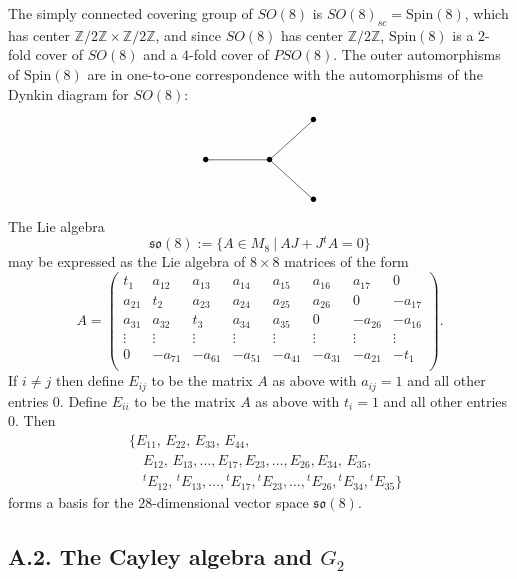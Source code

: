 \documentclass[12pt,letterpaper]{amsart}
\theoremstyle{plain}
\theoremstyle{definition}
\theoremstyle{remark}
\theoremstyle{definition}
\newcommand{\zzz}{\mathbb{Z}}
\begin{document}
The simply connected covering group of $SO(8)$ is
$SO(8)_{sc} = \mathrm{Spin}(8)$, which has center $\zzz /2\zzz \times \zzz /2\zzz$,
and since $SO(8)$ has center $\zzz /2\zzz$, $\mathrm{Spin}(8)$ is a $2$-fold cover
of $SO(8)$ and a $4$-fold cover of $PSO(8)$. The outer automorphisms
of $\mathrm{Spin}(8)$ are in one-to-one correspondence with the automorphisms
of the Dynkin diagram for $SO(8)$:
\[
\begin{tikzpicture}[baseline=(c.base)]
\draw (0,0) -- (-1.6,0) (0,0) -- (1.1,1.0) (0,0) -- (1.1,-1.0);
\node (c) at (0,0) {$\bullet$};
\node at (-1.6,0) {$\bullet$};
\node at (1.1,1.0) {$\bullet$};
\node at (1.1,-1.0) {$\bullet$};
\end{tikzpicture}
\]
The Lie algebra
\[
\mathfrak{so}(8) := \{A \in M_8\ |\ AJ + J{}^{t}A = 0\}
\]
may be expressed as the Lie algebra of $8\times 8$ matrices of the
form
\[
A =  {\begin{pmatrix} t_{1}&a_{12}&a_{13}&a_{14}&a_{15}&a_{16}&a_{17}&0\\
a_{21}&t_2&a_{23}&a_{24}&a_{25}&a_{26}&0&-a_{17}\\
a_{31}&a_{32}&t_3&a_{34}&a_{35}&0&-a_{26}&-a_{16}\\
\vdots&\vdots &\vdots &\vdots &\vdots &\vdots &\vdots &\vdots\\
0&-a_{71}&-a_{61}&-a_{51}&-a_{41}&-a_{31}&-a_{21}&-t_1\\
\end{pmatrix}}.\tag{A.2}
\]
If $i \not= j$ then define $E_{ij}$ to be the matrix $A$ as above with
$a_{ij} = 1$ and all other entries $0$. Define $E_{ii}$ to be the
matrix $A$ as above with $t_i = 1$ and all other entries $0$. Then
\[
\begin{split}
&\big\{ E_{11},\,  E_{22},\, E_{33},\, E_{44},\\
&\quad E_{12},\, E_{13},\dots ,E_{17},
       E_{23},\dots ,E_{26},
       E_{34},\, E_{35},\\
&\quad {{}^{t}E_{12}},\, {{}^{t}E_{13}},\dots ,{{}^{t}E_{17}},
       {{}^{t}E_{23}},\dots ,{{}^{t}E_{26}},
       {{}^{t}E_{34}},{{}^{t}E_{35}} \big\}
\end{split}\tag{A.3}
\]
forms a basis
for the $28$-dimensional vector space $\mathfrak{so}(8)$.

\subsection*{A.2. The Cayley algebra and \texorpdfstring{$G_2$}{G2}}
\end{document}
